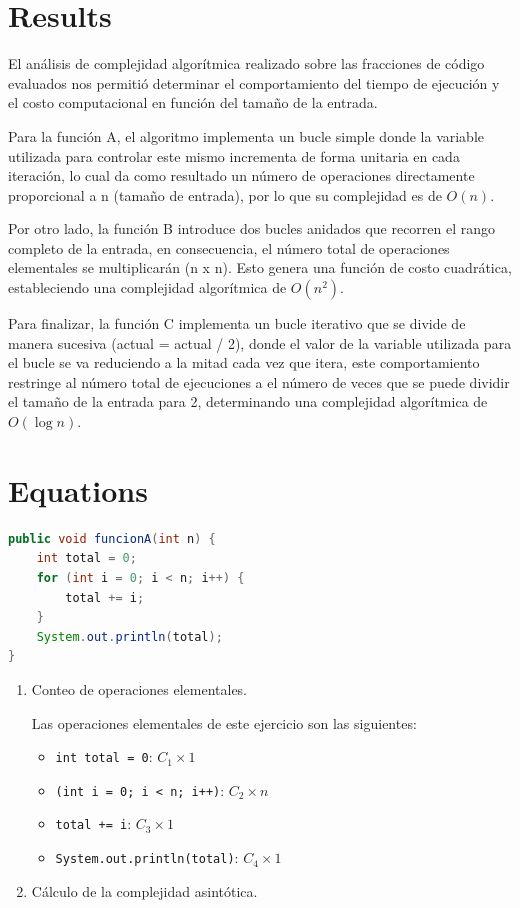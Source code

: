 \documentclass[pdflatex,sn-mathphys-num]{sn-jnl}%
\theoremstyle{thmstyleone}%
\theoremstyle{thmstyletwo}%
\theoremstyle{thmstylethree}%
\begin{document}
\section{Results}\label{sec2}

El análisis de complejidad algorítmica realizado sobre las fracciones de código evaluados nos permitió determinar el comportamiento del tiempo de ejecución y el costo computacional en función del tamaño de la entrada.

Para la función A, el algoritmo implementa un bucle simple donde la variable utilizada para controlar este mismo incrementa de forma unitaria en cada iteración, lo cual da como resultado un número de operaciones directamente proporcional a n (tamaño de entrada), por lo que su complejidad es de $O(n)$.

Por otro lado, la función B introduce dos bucles anidados que recorren el rango completo de la entrada, en consecuencia, el número total de operaciones elementales se multiplicarán (n x n). Esto genera una función de costo cuadrática, estableciendo una complejidad algorítmica de $O(n^2)$.

Para finalizar, la función C implementa un bucle iterativo que se divide de manera sucesiva (actual = actual / 2), donde el valor de la variable utilizada para el bucle se va reduciendo a la mitad cada vez que itera, este comportamiento restringe al número total de ejecuciones a el número de veces que se puede dividir el tamaño de la entrada para 2, determinando una complejidad algorítmica de $O(\log n)$.

\section{Equations}\label{sec3}

\begin{lstlisting}[language=Java,caption={C\'odigo A}]
public void funcionA(int n) {
    int total = 0;
    for (int i = 0; i < n; i++) {
        total += i;
    }
    System.out.println(total);
}
\end{lstlisting}


\begin{enumerate}
    \item Conteo de operaciones elementales. 

Las operaciones elementales de este ejercicio son las siguientes:
\begin{itemize}
    \item \texttt{int total = 0}: $C_1 \times 1$
    \item \texttt{(int i = 0; i < n; i++)}: $C_2 \times n$
    \item \texttt{total += i}: $C_3 \times 1$
    \item \texttt{System.out.println(total)}: $C_4 \times 1$
\end{itemize}

    \item C\'alculo de la complejidad asint\'otica.
\end{enumerate}
\end{document}
